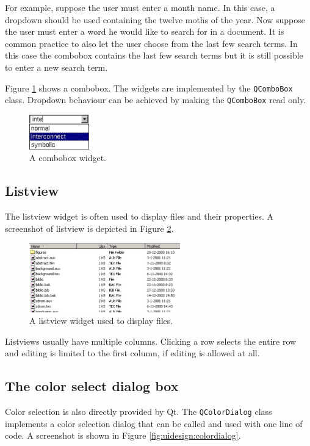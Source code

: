 For example, suppose the user must enter a month name. In this case, a dropdown
should be used containing the twelve moths of the year. Now suppose the user
must enter a word he would like to search for in a document. It is common
practice to also let the user choose from the last few search terms. In this
case the combobox contains the last few search terms but it is still possible
to enter a new search term.

\bigskip \noindent
Figure \ref{fig:uidesign:combobox} shows a combobox. The widgets are
implemented by the \verb=QComboBox= class. Dropdown behaviour can be achieved
by making the \verb=QComboBox= read only.

\begin{figure}[ht] \begin{center}
\includegraphics[height=15mm]{./figures/combobox.eps}
\caption{A combobox widget.}
\label{fig:uidesign:combobox}
\end{center} \end{figure}

\subsection{Listview}
The listview widget is often used to display files and their properties. A
screenshot of listview is depicted in Figure \ref{fig:uidesign:listview}.
\begin{figure}[ht] \begin{center}
\includegraphics[height=3cm]{./figures/listview.eps}
\caption{A listview widget used to display files.}
\label{fig:uidesign:listview}
\end{center} \end{figure}
Listviews usually have multiple columns. Clicking a row selects the entire row
and editing is limited to the first column, if editing is allowed at all.

\subsection{The color select dialog box}
Color selection is also directly provided by Qt. The \verb=QColorDialog= class
implements a color selection dialog that can be called and used with one line
of code. A screenshot is shown in Figure \ref{fig:uidesign:colordialog}.

